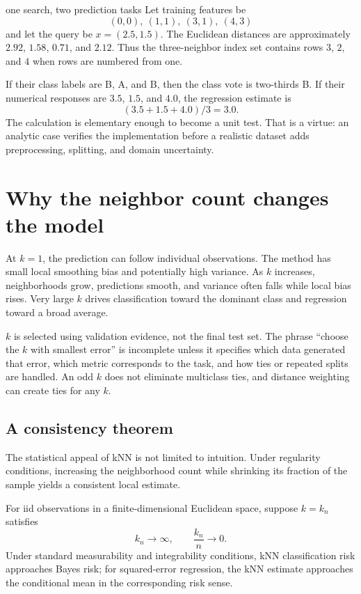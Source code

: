 \begin{workedexample}{one search, two prediction tasks}
Let training features be
\[
(0,0),\ (1,1),\ (3,1),\ (4,3)
\]
and let the query be $x=(2.5,1.5)$. The Euclidean distances are approximately
$2.92$, $1.58$, $0.71$, and $2.12$. Thus the three-neighbor index set contains
rows $3$, $2$, and $4$ when rows are numbered from one.

If their class labels are B, A, and B, then the class vote is two-thirds B. If
their numerical responses are $3.5$, $1.5$, and $4.0$, the regression estimate
is
\[
(3.5+1.5+4.0)/3=3.0.
\]
The calculation is elementary enough to become a unit test. That is a virtue:
an analytic case verifies the implementation before a realistic dataset adds
preprocessing, splitting, and domain uncertainty.
\end{workedexample}

\section{Why the neighbor count changes the model}

At $k=1$, the prediction can follow individual observations. The method has
small local smoothing bias and potentially high variance. As $k$ increases,
neighborhoods grow, predictions smooth, and variance often falls while local
bias rises. Very large $k$ drives classification toward the dominant class and
regression toward a broad average.

$k$ is selected using validation evidence, not the final test set. The phrase
``choose the $k$ with smallest error'' is incomplete unless it specifies which
data generated that error, which metric corresponds to the task, and how ties
or repeated splits are handled. An odd $k$ does not eliminate multiclass ties,
and distance weighting can create ties for any $k$.

\subsection{A consistency theorem}

The statistical appeal of kNN is not limited to intuition. Under regularity
conditions, increasing the neighborhood count while shrinking its fraction of
the sample yields a consistent local estimate.

\begin{theorem}
For iid observations in a finite-dimensional Euclidean space, suppose
$k=k_n$ satisfies
\[
k_n\longrightarrow\infty,
\qquad
\frac{k_n}{n}\longrightarrow 0.
\]
Under standard measurability and integrability conditions, kNN classification
risk approaches Bayes risk; for squared-error regression, the kNN estimate
approaches the conditional mean in the corresponding risk sense.
\end{theorem}

